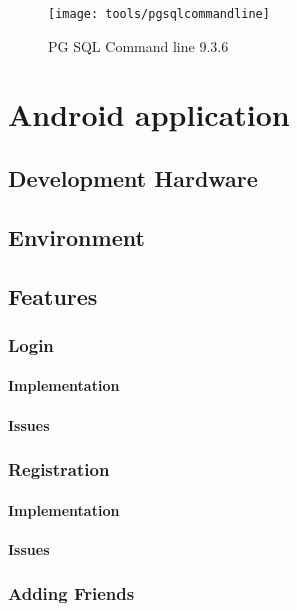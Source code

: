 \begin{figure}[h]
    \centering
    \texttt{[image: tools/pgsqlcommandline]}
    \caption{PG SQL Command line 9.3.6}
    \label{fig:pg_sql_image}
\end{figure} 
\noindent


\section{Android application}

\subsection{Development Hardware}

\subsection{Environment}

\subsection{Features}


\subsubsection*{Login}

\paragraph*{Implementation}

\paragraph*{Issues}


\subsubsection*{Registration}

\paragraph*{Implementation}

\paragraph*{Issues}


\subsubsection*{Adding Friends}

